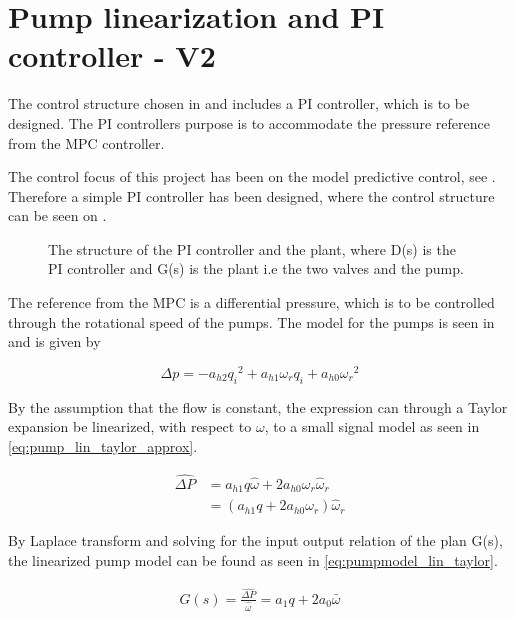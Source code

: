 \chapter{Pump linearization and PI controller - V2}
\label{cha:linear_pump2}

The control structure chosen in  and  includes a PI controller, which is to be designed. The PI controllers purpose is to accommodate the pressure reference from the MPC controller. 

The control focus of this project has been on the model predictive control, see . Therefore a simple PI controller has been designed, where the control structure can be seen on .

\begin{figure}[H]
\centering
  
\caption{The structure of the PI controller and the plant, where D(s) is the PI controller and G(s) is the plant i.e the two valves and the pump.}
\label{fig:simple_PI}
\end{figure}

The reference from the MPC is a differential pressure, which is to be controlled through the rotational speed of the pumps. The model for the pumps is seen in  and is given by

\begin{equation*}
\Delta p = -a_{h2}{q_i}^2 + a_{h1} \omega_r q_i + a_{h0}{\omega_r}^2
\end{equation*}

By the assumption that the flow is constant, the expression can through a Taylor expansion be linearized, with respect to $\omega$, to a small signal model as seen in \eqref{eq:pump_lin_taylor_approx}.


\begin{equation}
	\begin{split}
		\hat{\Delta P} &= a_{h1}q\hat{\omega} + 2a_{h0}{\omega_r}\hat{\omega}_r\\
					   &= (a_{h1}q + 2a_{h0}{\omega_r}) \hat{\omega}_r
	\end{split}
	\label{eq:pump_lin_taylor_approx}
\end{equation}

By Laplace transform and solving for the input output relation of the plan G(s), the linearized pump model can be found as seen in \eqref{eq:pumpmodel_lin_taylor}.

\begin{equation}
	\begin{split}
		G(s) = \frac{\hat{\Delta P}}{\hat{\omega}} = a_1q + 2a_0\bar{\omega}
	\end{split}
	\label{eq:pumpmodel_lin_taylor}
\end{equation}

